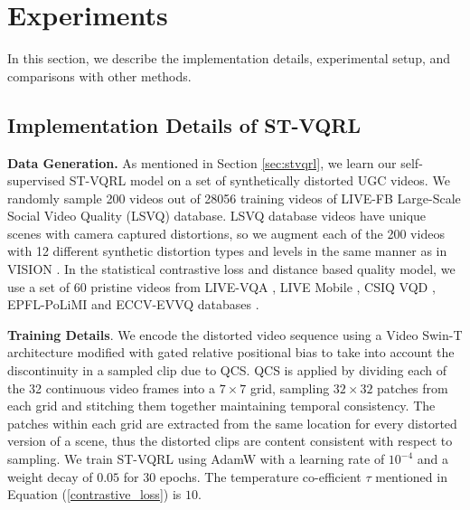 \documentclass[10pt,twocolumn,letterpaper]{article}
\begin{document}
\section{Experiments} \label{sec:experiments}
 In this section, we describe the implementation details, experimental setup, and comparisons with other methods.

\subsection{Implementation Details of ST-VQRL}

\textbf{Data Generation.} As mentioned in Section \ref{sec:stvqrl}, we learn our self-supervised ST-VQRL model on a set of synthetically distorted UGC videos. We randomly sample 200 videos out of 28056 training videos of LIVE-FB Large-Scale Social Video Quality (LSVQ) \cite{patchVQ} database. LSVQ database videos have unique scenes with camera captured distortions, so we augment each of the 200 videos with 12 different synthetic distortion types and levels in the same
manner as in VISION \cite{vision}. In the statistical contrastive loss and distance based quality model, we use a set of 60 pristine videos from LIVE-VQA \cite{live_sd1}, LIVE Mobile \cite{mobile1}, CSIQ VQD \cite{csiq}, EPFL-PoLiMI \cite{epfl1} and ECCV-EVVQ databases \cite{ecvq_evvq2}.

\textbf{Training Details}.
We encode the distorted video sequence using a Video Swin-T \cite{video_swin_t} architecture modified with gated relative positional bias \cite{fastVQA} to take into account the discontinuity in a sampled clip due to QCS. QCS is applied by dividing each of the 32 continuous video frames into a $7\times 7$ grid, sampling $32\times 32$ patches from each grid and stitching them together maintaining temporal consistency. The patches within each grid are extracted from the same location for every distorted version of a scene, thus the distorted clips are content consistent with respect to sampling. We train ST-VQRL using AdamW \cite{adamw} with a learning rate of $10^{-4}$ and a weight decay of $0.05$ for 30 epochs. The temperature co-efficient $\tau$ mentioned in Equation (\ref{contrastive_loss}) is  $10$.
\end{document}
